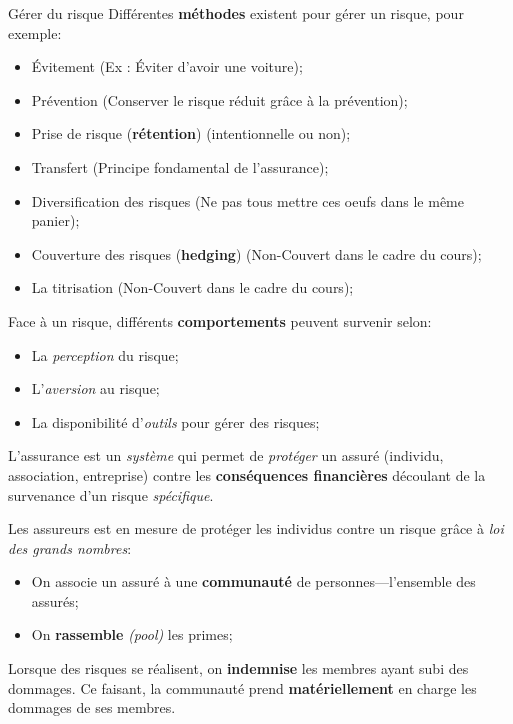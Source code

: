 \documentclass[10pt, french]{article}
\begin{document}
\begin{multicols*}{3}
\begin{algo}{Gérer du risque}
Différentes \textbf{méthodes} existent pour gérer un risque, pour exemple:
\begin{itemize}[leftmargin = *]
	\item	Évitement (Ex : Éviter d'avoir une voiture);
	\item	Prévention (Conserver le risque réduit grâce à la prévention);
	\item	Prise de risque (\textbf{rétention}) (intentionnelle ou non);
	\item	Transfert (Principe fondamental de l'assurance);
	\item	Diversification des risques (Ne pas tous mettre ces oeufs dans le même panier);
	\item	\textcolor{amaranth}{Couverture des risques (\textbf{hedging}) (Non-Couvert dans le cadre du cours)};
	\item	\textcolor{amaranth}{La titrisation (Non-Couvert dans le cadre du cours)};
\end{itemize}
%
Face à un risque, différents \textbf{comportements} peuvent survenir selon:
\begin{itemize}
	\item	La \textit{perception} du risque;
	\item	L'\textit{aversion} au risque;
	\item	La disponibilité d'\textit{outils} pour gérer des risques;
\end{itemize}
\end{algo}

\begin{definitionNOHFILL}[L'assurance]
L'assurance est un \textit{système} qui permet de \textit{protéger} un assuré (individu, association, entreprise) contre les \textbf{conséquences \textbf{financières}} découlant de la survenance d'un risque \textit{spécifique}.

Les assureurs est en mesure de protéger les individus contre un risque grâce à \textit{loi des grands nombres}:
\begin{itemize}
	\item	On associe un assuré à une \textbf{communauté} de personnes---l'ensemble des assurés;
	\item	On \textbf{rassemble} \textit{(pool)} les primes; 
\end{itemize}
Lorsque des risques se réalisent, on \textbf{indemnise} les membres ayant subi des dommages. Ce faisant, la communauté prend \textbf{matériellement} en charge les dommages de ses membres.


\end{definitionNOHFILL}
\end{multicols*}
\end{document}
